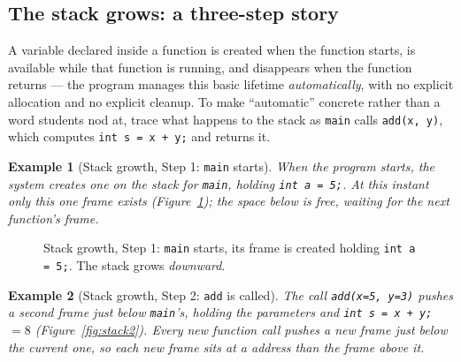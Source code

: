 \documentclass[11pt]{article}
\newtheorem{example}{Example}[section]
\begin{document}
\subsection{The stack grows: a three-step story}

A variable declared inside a function is created when the function starts, is available while that function is running, and disappears when the function returns --- the program manages this basic lifetime \emph{automatically}, with no explicit allocation and no explicit cleanup. To make ``automatic'' concrete rather than a word students nod at, trace what happens to the stack as \texttt{main} calls \texttt{add(x, y)}, which computes \texttt{int s = x + y;} and returns it.

\begin{example}[Stack growth, Step 1: \texttt{main} starts]
When the program starts, the system creates one  on the stack for \texttt{main}, holding \texttt{int a = 5;}. At this instant only this one frame exists (Figure~\ref{fig:stack1}); the space below is free, waiting for the next function's frame.
\end{example}

\begin{figure}[h]
  \centering
  \caption{Stack growth, Step 1: \texttt{main} starts, its frame is created
  holding \texttt{int a = 5;}. The stack grows \emph{downward}.}
  \label{fig:stack1}
\end{figure}

\begin{example}[Stack growth, Step 2: \texttt{add} is called]
The call \texttt{add(x=5, y=3)} pushes a \emph{second} frame just below \texttt{main}'s, holding the parameters and \texttt{int s = x + y;} $= 8$ (Figure~\ref{fig:stack2}). Every new function call pushes a new frame just below the current one, so each new frame sits at a  address than the frame above it.
\end{example}
\end{document}
